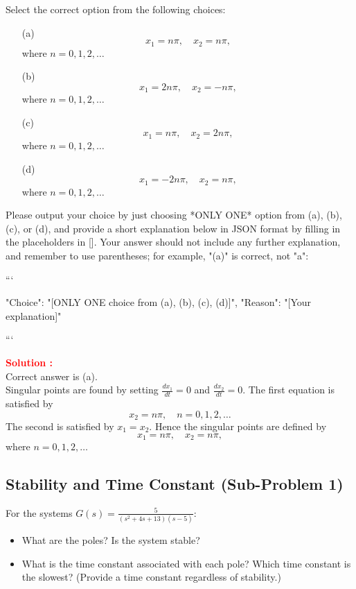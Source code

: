 \documentclass[12pt]{article}
\begin{document}
Select the correct option from the following choices:
\begin{itemize}
    \item[(a)] \[ x_1 =  n\pi, \quad x_2 =  n\pi, \] where \(n = 0, 1, 2, \ldots\)
    \item[(b)] \[ x_1 =  2n\pi, \quad x_2 =  -n\pi, \] where \(n = 0, 1, 2, \ldots\)
    \item[(c)] \[ x_1 =  n\pi, \quad x_2 =  2n\pi, \] where \(n = 0, 1, 2, \ldots\)
    \item[(d)] \[ x_1 =  -2n\pi, \quad x_2 =  n\pi, \] where \(n = 0, 1, 2, \ldots\)
\end{itemize}




Please output your choice by just choosing *ONLY ONE* option from (a), (b), (c), or (d), and provide a short explanation below in JSON format by filling in the placeholders in []. Your answer should not include any further explanation, and remember to use parentheses; for example, "(a)" is correct, not "a":

```

{
"Choice": "[ONLY ONE choice from (a), (b), (c), (d)]",
"Reason": "[Your explanation]"
}

```

\textbf{\textcolor{red}{Solution :}} \\
Correct answer is (a).\\
Singular points are found by setting \(\frac{dx_1}{dt} = 0\) and \(\frac{dx_2}{dt} = 0\). The first equation is satisfied by
\[ x_2 =  n\pi, \quad n = 0, 1, 2, \ldots \]
The second is satisfied by \(x_1 = x_2\). Hence the singular points are defined by
\[ x_1 =  n\pi, \quad x_2 =  n\pi, \]
where \(n = 0, 1, 2, \ldots\)
\clearpage

\subsection{Stability and Time Constant (Sub-Problem 1)}

For the systems \(G(s) = \frac{5}{(s^2+4s+13)(s-5)}\):
\begin{itemize}
    \item What are the poles? Is the system stable?
    \item What is the time constant associated with each pole? Which time constant is the slowest? (Provide a time constant regardless of stability.)
\end{itemize}
\end{document}
